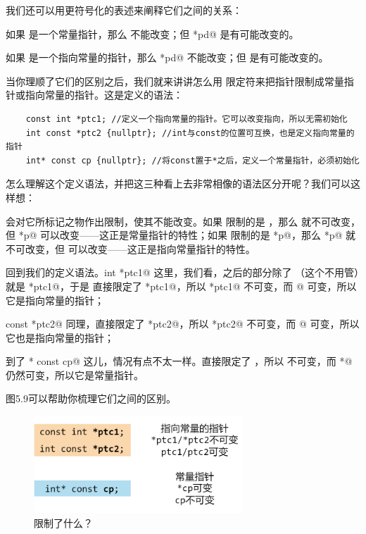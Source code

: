 我们还可以用更符号化的表述来阐释它们之间的关系：\par
如果 \lstinline@pd@ 是一个常量指针，那么 \lstinline@pd@ 不能改变；但 \lstinline@*pd@ 是有可能改变的。\par
如果 \lstinline@pd@ 是一个指向常量的指针，那么 \lstinline@*pd@ 不能改变；但 \lstinline@pd@ 是有可能改变的。\par
当你理顺了它们的区别之后，我们就来讲讲怎么用 \lstinline@const@ 限定符来把指针限制成常量指针或指向常量的指针。这是定义的语法：
\begin{lstlisting}
    const int *ptc1; //定义一个指向常量的指针。它可以改变指向，所以无需初始化
    int const *ptc2 {nullptr}; //int与const的位置可互换，也是定义指向常量的指针
    int* const cp {nullptr}; //将const置于*之后，定义一个常量指针，必须初始化
\end{lstlisting}
怎么理解这个定义语法，并把这三种看上去非常相像的语法区分开呢？我们可以这样想：\par
\lstinline@const@ 会对它所标记之物作出限制，使其不能改变。如果 \lstinline@const@ 限制的是 \lstinline@p@，那么 \lstinline@p@ 就不可改变，但 \lstinline@*p@ 可以改变——这正是常量指针的特性；如果 \lstinline@const@ 限制的是 \lstinline@*p@，那么 \lstinline@*p@ 就不可改变，但 \lstinline@p@ 可以改变——这正是指向常量指针的特性。\par
回到我们的定义语法。\lstinline@const int *ptc1@ 这里，我们看，\lstinline@const@ 之后的部分除了 \lstinline@int@（这个不用管）就是 \lstinline@*ptc1@，于是 \lstinline@const@ 直接限定了 \lstinline@*ptc1@，所以 \lstinline@*ptc1@ 不可变，而 @ 可变，所以它是指向常量的指针；\par
\lstinline@int const *ptc2@ 同理，\lstinline@const@ 直接限定了 \lstinline@*ptc2@，所以 \lstinline@*ptc2@ 不可变，而 @ 可变，所以它也是指向常量的指针；\par
到了 \lstinline@int* const cp@ 这儿，情况有点不太一样。\lstinline@const@ 直接限定了 \lstinline@cp@，所以 \lstinline@cp@ 不可变，而 \lstinline@cp*@ 仍然可变，所以它是常量指针。\par
图5.9可以帮助你梳理它们之间的区别。\par
\begin{figure}[htbp]
    \centering
    \includegraphics[width=0.7\textwidth]{../images/generalized_parts/05_definition_of_constant_pointer_and_pointer_to_const_300.png}
    \caption{\lstinline@const@ 限制了什么？}
\end{figure}
